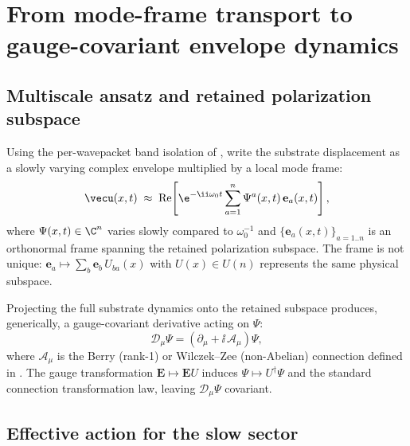 \section{From mode-frame transport to gauge-covariant envelope dynamics}
\label{sec:effective-field}

\subsection{Multiscale ansatz and retained polarization subspace}

Using the per-wavepacket band isolation of , write the substrate
displacement as a slowly varying complex envelope multiplied by a local mode frame:
\begin{equation}
  \vecu(x,t)\;\approx\;
  \mathrm{Re}\!\left[
    \e^{-\ii\omega_0 t}\sum_{a=1}^{n}\Psi^a(x,t)\,\mathbf{e}_a(x,t)
  \right],
  \label{eq:multiscale-ansatz}
\end{equation}
where $\Psi(x,t)\in\C^n$ varies slowly compared to $\omega_0^{-1}$ and
$\{\mathbf{e}_a(x,t)\}_{a=1..n}$ is an orthonormal frame spanning the retained polarization subspace.
The frame is not unique: $\mathbf{e}_a\mapsto \sum_b \mathbf{e}_b\,U_{ba}(x)$ with $U(x)\in U(n)$ represents the same
physical subspace.

Projecting the full substrate dynamics onto the retained subspace produces, generically, a gauge-covariant derivative
acting on $\Psi$:
\begin{equation}
  \mathcal{D}_\mu \Psi
  =
  \left(\partial_\mu + \ii\,\mathcal{A}_\mu\right)\Psi,
  \label{eq:covD}
\end{equation}
where $\mathcal{A}_\mu$ is the Berry (rank-1) or Wilczek--Zee (non-Abelian) connection defined in .
The gauge transformation $\mathbf{E}\mapsto \mathbf{E}U$ induces $\Psi\mapsto U^\dagger\Psi$ and the standard
connection transformation law, leaving $\mathcal{D}_\mu\Psi$ covariant.

\subsection{Effective action for the slow sector}

